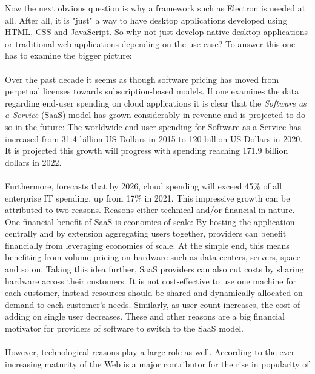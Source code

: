 Now the next obvious question is why a framework such as Electron is needed at all.
After all, it is "just" a way to have desktop applications developed using HTML, CSS and JavaScript.
So why not just develop native desktop applications or traditional web applications depending on the use case?
To answer this one has to examine the bigger picture:\paragraph{}
Over the past decade it seems as though software pricing has moved from perpetual licenses towards subscription-based
models.
If one examines the data regarding end-user spending on cloud applications it is clear that the
\emph{Software as a Service} (SaaS) model has grown considerably in revenue and is projected to do so in the future:
The worldwide end user spending for Software as a Service has increased from 31.4 billion US Dollars in 2015 to 120
billion US Dollars in 2020.
It is projected this growth will progress with spending reaching 171.9 billion dollars in 2022. \parencite{gartner2021}\paragraph{}
Furthermore, \textcite{gartner2021} forecasts that by 2026, cloud spending will exceed 45\% of all enterprise IT spending, up from
17\% in 2021.
This impressive growth can be attributed to two reasons.
Reasons either technical and/or financial in nature.
One financial benefit of SaaS is economies of scale:
By hosting the application centrally and by extension aggregating users together, providers can benefit financially from
leveraging economies of scale.
At the simple end, this means benefiting from volume pricing on hardware such as data centers, servers, space and so on.
Taking this idea further, SaaS providers can also cut costs by sharing hardware across their customers.
It is not cost-effective to use one machine for each customer, instead resources should be shared and dynamically
allocated on-demand to each customer's needs.
Similarly, as user count increases, the cost of adding on single user decreases.
These and other reasons are a big financial motivator for providers of software to switch to the SaaS model.\paragraph{}
However, technological reasons play a large role as well.
According to \textcite{jacobs2005} the ever-increasing maturity of the Web is a major contributor for the rise in popularity of
